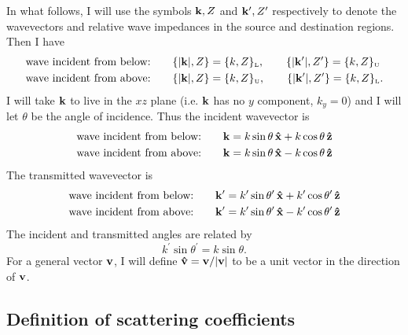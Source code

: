 \documentclass[letterpaper]{article}
\begin{document}
In what follows, I will use the
symbols $\mathbf{k},Z$ and $\mathbf{k}^\prime,Z^\prime$ respectively to denote the 
wavevectors and relative wave impedances in the source and destination 
regions. Then I have
\begin{align*}
\text{wave incident from below:} \qquad
   &\{|\mathbf{k}|,Z\}=\{k, Z\}_{\hbox{\tiny{L}}}, \qquad
    \{|\mathbf{k}^\prime|,Z^\prime\}=\{k, Z\}_{\hbox{\tiny{U}}}
\\
\text{wave incident from above:} \qquad
   &\{|\mathbf{k}|,Z\}=\{k, Z\}_{\hbox{\tiny{U}}}, \qquad
    \{|\mathbf{k}^\prime|,Z^\prime\}=\{k, Z\}_{\hbox{\tiny{L}}}.
\end{align*}
I will take $\mathbf{k}$ to live in the $xz$ plane (i.e. $\mathbf{k}$
has no $y$ component, $k_y=0$) and I will let $\theta$ be 
the angle of incidence. Thus the incident wavevector is
\begin{align*}
 \text{wave incident from below:} 
  \qquad &\mathbf{k}= k\sin\theta\,\mathbf{\hat x} + k\cos\theta\,\mathbf{\hat z}
\\
 \text{wave incident from above:} 
  \qquad &\mathbf{k}= k\sin\theta\,\mathbf{\hat x} - k\cos\theta\,\mathbf{\hat z}
\end{align*}
The transmitted wavevector is 
\begin{align*}
 \text{wave incident from below:} 
  \qquad & \mathbf{k}^\prime = 
    k^\prime\sin\theta^\prime\,\mathbf{\hat x} + k^\prime\cos\theta^\prime\,\mathbf{\hat z}
\\
 \text{wave incident from above:} 
  \qquad &\mathbf{k}^\prime  = 
    k^\prime\sin\theta^\prime\,\mathbf{\hat x} - k^\prime\cos\theta^\prime\,\mathbf{\hat z}
\end{align*}
The incident and transmitted angles are related by 
$$ k^\prime \sin\theta^\prime = k\sin\theta.$$
For a general vector $\mathbf{v}$, I will define $\mathbf{\hat v}=\mathbf{v}/|\mathbf{v}|$ 
to be a unit vector in the direction of $\mathbf{v}$.

\subsection*{Definition of scattering coefficients}
\end{document}

